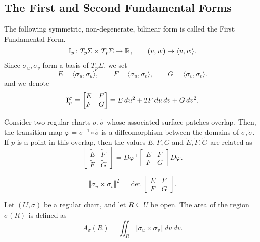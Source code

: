 \documentclass[11pt]{article}
\newcommand{\R}{\mathbb{R}}
\newcommand{\I}{{\rm I}}
\newcommand{\ip}[2]{\langle #1, #2 \rangle}
\newcommand{\norm}[1]{\Vert #1 \Vert}
\theoremstyle{definition}
\theoremstyle{remark}
\numberwithin{equation}{section}
\begin{document}
    \subsection{The First and Second Fundamental Forms}

    \begin{definition}
        The following symmetric, non-degenerate, bilinear form is called the First
        Fundamental Form. \[
            \I_p\colon T_p\Sigma \times T_p\Sigma \to \R, \qquad (v, w) \mapsto
            \ip{v}{w}.
        \] Since $\sigma_u, \sigma_v$ form a basis of $T_p\Sigma$, we set \[
            E = \ip{\sigma_u}{\sigma_u}, \qquad
            F = \ip{\sigma_u}{\sigma_v}, \qquad
            G = \ip{\sigma_v}{\sigma_v}.
        \] and we denote \[
            \I_p^\sigma \equiv \begin{bmatrix}
                E & F \\ F & G
            \end{bmatrix} \equiv E\,du^2 + 2F\,du\,dv + G\,dv^2.
        \] 
    \end{definition}

    \begin{lemma}
        Consider two regular charts $\sigma, \tilde{\sigma}$ whose associated surface
        patches overlap. Then, the transition map $\varphi = \sigma^{-1}\circ
        \tilde{\sigma}$ is a diffeomorphism between the domains of $\sigma,
        \tilde{\sigma}$. If $p$ is a point in this overlap, then the values $E, F, G$
        and $\tilde{E}, \tilde{F}, \tilde{G}$ are related as \[
            \begin{bmatrix}
                \tilde{E} & \tilde{F} \\ \tilde{F} & \tilde{G}
            \end{bmatrix} = D\varphi^\top \begin{bmatrix}
                E & F \\ F & G
            \end{bmatrix} D\varphi.
        \] 
    \end{lemma}

    \begin{lemma}
        \[
            \norm{\sigma_u\times \sigma_v}^2 = \det \begin{bmatrix}
                E & F \\ F & G
            \end{bmatrix}.
        \] 
    \end{lemma}

    \begin{definition}
        Let $(U, \sigma)$ be a regular chart, and let $R \subseteq U$ be open. The
        area of the region $\sigma(R)$ is defined as \[
            A_\sigma(R) = \iint_{R} \norm{\sigma_u \times \sigma_v} \:du\,dv.
        \] 
    \end{definition}
\end{document}
